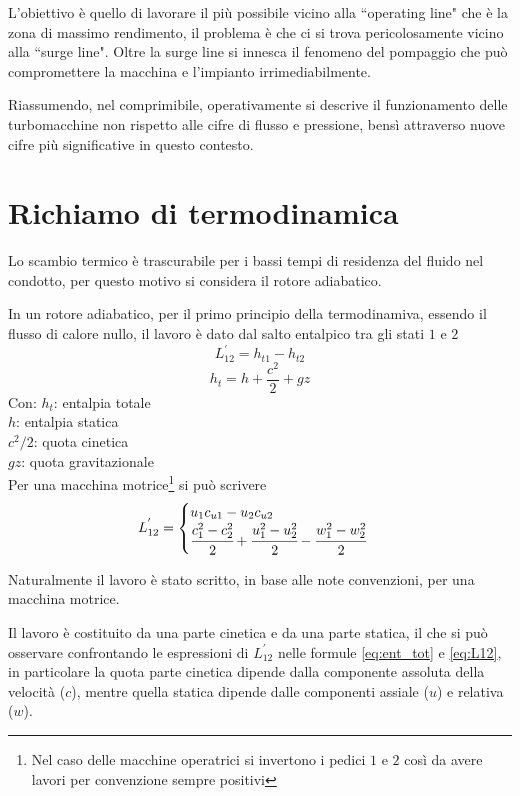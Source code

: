 L'obiettivo è quello di lavorare il più possibile vicino alla ``operating line" che è la zona di massimo rendimento, il problema è che ci si trova pericolosamente vicino alla ``surge line". Oltre la surge line si innesca il fenomeno del pompaggio che può compromettere la macchina e l'impianto irrimediabilmente.

Riassumendo, nel comprimibile, operativamente si descrive il funzionamento delle turbomacchine non rispetto alle cifre di flusso e pressione, bensì attraverso nuove cifre più significative in questo contesto.
\section{Richiamo di termodinamica}
Lo scambio termico è trascurabile per i bassi tempi di residenza del fluido nel condotto, per questo motivo si considera il rotore adiabatico.

In un rotore adiabatico, per il primo principio della termodinamiva, essendo il flusso di calore nullo, il lavoro è dato dal salto entalpico tra gli stati $1$ e $2$
\begin{equation}
L_{12}^{'} = h_{t1}-h_{t2}
\end{equation}
\begin{equation}\label{eq:ent_tot}
h_t=h+\frac{c^2}{2}+gz
\end{equation}
Con: 
$h_t$: entalpia totale\\
$h$: entalpia statica\\
$c^2/2$: quota cinetica\\
$gz$: quota gravitazionale\\[2mm]
Per una macchina motrice\footnote{Nel caso delle macchine operatrici si invertono i pedici $1$ e $2$ così da avere lavori per convenzione sempre positivi} si può scrivere
\begin{equation}\label{eq:L12}
L_{12}^{'} = \begin{cases} u_1 c_{u1}-u_2 c_{u2}\\
\cfrac{c_1^2-c_2^2}{2}+\cfrac{u_1^2-u_2^2}{2}-\cfrac{w_1^2-w_2^2}{2} \end{cases}
\end{equation}

Naturalmente il lavoro è stato scritto, in base alle note convenzioni, per una macchina motrice.

Il lavoro è costituito da una parte cinetica e da una parte statica, il che si può osservare confrontando le espressioni di $L_{12}^{'}$ nelle formule \ref{eq:ent_tot} e \ref{eq:L12}, in particolare la quota parte cinetica dipende dalla componente assoluta della velocità ($c$), mentre quella statica dipende dalle componenti assiale ($u$) e relativa ($w$).


